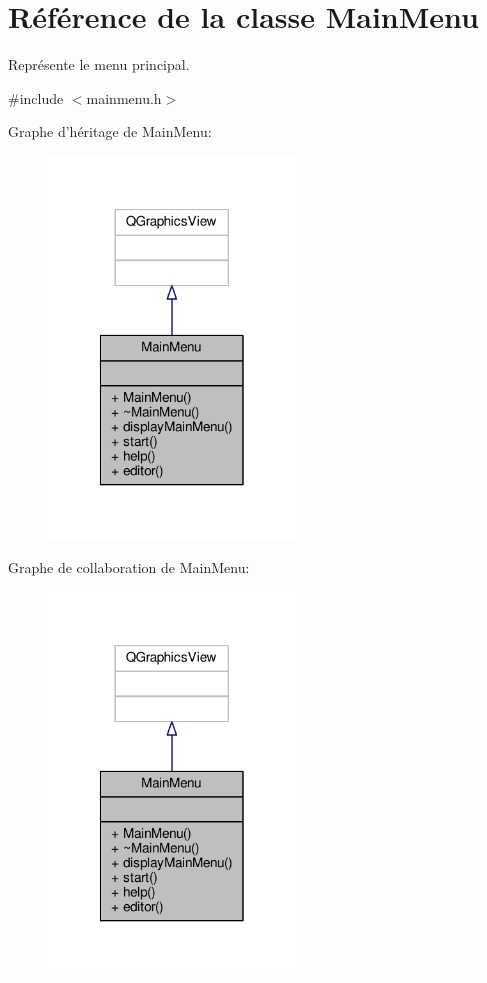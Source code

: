 \hypertarget{classMainMenu}{\section{Référence de la classe Main\+Menu}
\label{classMainMenu}
}


Représente le menu principal.  




{\ttfamily \#include $<$mainmenu.\+h$>$}



Graphe d'héritage de Main\+Menu\+:
\nopagebreak
\begin{figure}[H]
\begin{center}
\leavevmode
\includegraphics[width=186pt]{db/d55/classMainMenu__inherit__graph}
\end{center}
\end{figure}


Graphe de collaboration de Main\+Menu\+:
\nopagebreak
\begin{figure}[H]
\begin{center}
\leavevmode
\includegraphics[width=186pt]{d8/d60/classMainMenu__coll__graph}
\end{center}
\end{figure}
